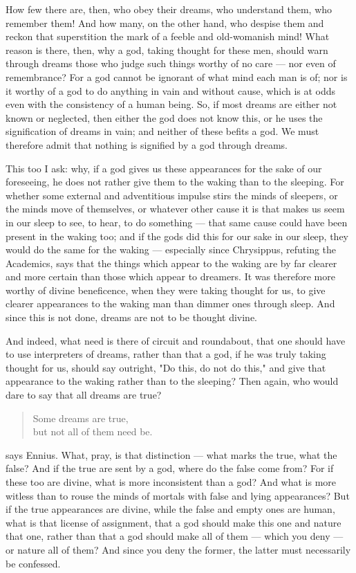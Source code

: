  How few there are, then, who obey their dreams, who understand them, who remember them! And how many, on the other hand, who despise them and reckon that superstition the mark of a feeble and old-womanish mind! What reason is there, then, why a god, taking thought for these men, should warn through dreams those who judge such things worthy of no care — nor even of remembrance? For a god cannot be ignorant of what mind each man is of; nor is it worthy of a god to do anything in vain and without cause, which is at odds even with the consistency of a human being. So, if most dreams are either not known or neglected, then either the god does not know this, or he uses the signification of dreams in vain; and neither of these befits a god. We must therefore admit that nothing is signified by a god through dreams.

 This too I ask: why, if a god gives us these appearances for the sake of our foreseeing, he does not rather give them to the waking than to the sleeping. For whether some external and adventitious impulse stirs the minds of sleepers, or the minds move of themselves, or whatever other cause it is that makes us seem in our sleep to see, to hear, to do something — that same cause could have been present in the waking too; and if the gods did this for our sake in our sleep, they would do the same for the waking — especially since Chrysippus, refuting the Academics, says that the things which appear to the waking are by far clearer and more certain than those which appear to dreamers. It was therefore more worthy of divine beneficence, when they were taking thought for us, to give clearer appearances to the waking man than dimmer ones through sleep. And since this is not done, dreams are not to be thought divine.

 And indeed, what need is there of circuit and roundabout, that one should have to use interpreters of dreams, rather than that a god, if he was truly taking thought for us, should say outright, "Do this, do not do this," and give that appearance to the waking rather than to the sleeping? Then again, who would dare to say that all dreams are true?
\begin{quote}
Some dreams are true, \\
but not all of them need be.
\end{quote}
says Ennius. What, pray, is that distinction — what marks the true, what the false? And if the true are sent by a god, where do the false come from? For if these too are divine, what is more inconsistent than a god? And what is more witless than to rouse the minds of mortals with false and lying appearances? But if the true appearances are divine, while the false and empty ones are human, what is that license of assignment, that a god should make this one and nature that one, rather than that a god should make all of them — which you deny — or nature all of them? And since you deny the former, the latter must necessarily be confessed.

